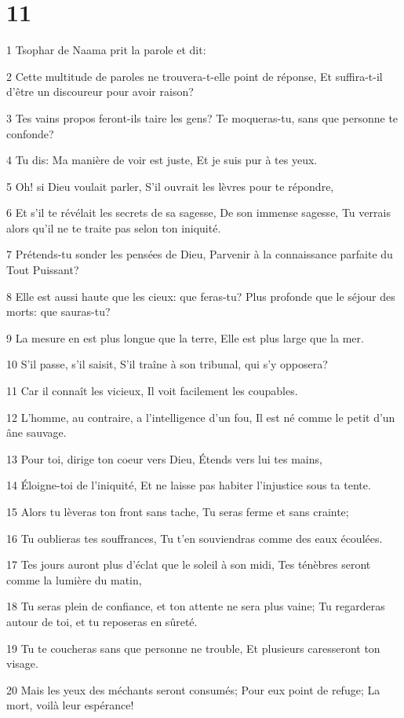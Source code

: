 \chapter{11}

\par 1 Tsophar de Naama prit la parole et dit:
\par 2 Cette multitude de paroles ne trouvera-t-elle point de réponse, Et suffira-t-il d'être un discoureur pour avoir raison?
\par 3 Tes vains propos feront-ils taire les gens? Te moqueras-tu, sans que personne te confonde?
\par 4 Tu dis: Ma manière de voir est juste, Et je suis pur à tes yeux.
\par 5 Oh! si Dieu voulait parler, S'il ouvrait les lèvres pour te répondre,
\par 6 Et s'il te révélait les secrets de sa sagesse, De son immense sagesse, Tu verrais alors qu'il ne te traite pas selon ton iniquité.
\par 7 Prétends-tu sonder les pensées de Dieu, Parvenir à la connaissance parfaite du Tout Puissant?
\par 8 Elle est aussi haute que les cieux: que feras-tu? Plus profonde que le séjour des morts: que sauras-tu?
\par 9 La mesure en est plus longue que la terre, Elle est plus large que la mer.
\par 10 S'il passe, s'il saisit, S'il traîne à son tribunal, qui s'y opposera?
\par 11 Car il connaît les vicieux, Il voit facilement les coupables.
\par 12 L'homme, au contraire, a l'intelligence d'un fou, Il est né comme le petit d'un âne sauvage.
\par 13 Pour toi, dirige ton coeur vers Dieu, Étends vers lui tes mains,
\par 14 Éloigne-toi de l'iniquité, Et ne laisse pas habiter l'injustice sous ta tente.
\par 15 Alors tu lèveras ton front sans tache, Tu seras ferme et sans crainte;
\par 16 Tu oublieras tes souffrances, Tu t'en souviendras comme des eaux écoulées.
\par 17 Tes jours auront plus d'éclat que le soleil à son midi, Tes ténèbres seront comme la lumière du matin,
\par 18 Tu seras plein de confiance, et ton attente ne sera plus vaine; Tu regarderas autour de toi, et tu reposeras en sûreté.
\par 19 Tu te coucheras sans que personne ne trouble, Et plusieurs caresseront ton visage.
\par 20 Mais les yeux des méchants seront consumés; Pour eux point de refuge; La mort, voilà leur espérance!


